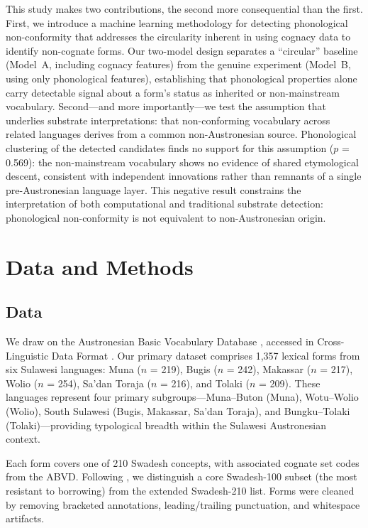 \documentclass[12pt]{article}
\begin{document}
This study makes two contributions, the second more consequential than the first.
First, we introduce a machine learning methodology for detecting phonological non-conformity that addresses the circularity inherent in using cognacy data to identify non-cognate forms.
Our two-model design separates a ``circular'' baseline (Model~A, including cognacy features) from the genuine experiment (Model~B, using only phonological features), establishing that phonological properties alone carry detectable signal about a form's status as inherited or non-mainstream vocabulary.
Second---and more importantly---we test the assumption that underlies substrate interpretations: that non-conforming vocabulary across related languages derives from a common non-Austronesian source.
Phonological clustering of the detected candidates finds no support for this assumption ($p$ = 0.569): the non-mainstream vocabulary shows no evidence of shared etymological descent, consistent with independent innovations rather than remnants of a single pre-Austronesian language layer.
This negative result constrains the interpretation of both computational and traditional substrate detection: phonological non-conformity is not equivalent to non-Austronesian origin.

\section{Data and Methods}

\subsection{Data}
\label{sec:data}

We draw on the Austronesian Basic Vocabulary Database \citep{greenhill2008}, accessed in Cross-Linguistic Data Format \citep[CLDF;][]{forkel2018}.
Our primary dataset comprises 1,357 lexical forms from six Sulawesi languages: Muna ($n$ = 219), Bugis ($n$ = 242), Makassar ($n$ = 217), Wolio ($n$ = 254), Sa'dan Toraja ($n$ = 216), and Tolaki ($n$ = 209).
These languages represent four primary subgroups---Muna--Buton (Muna), Wotu--Wolio (Wolio), South Sulawesi (Bugis, Makassar, Sa'dan Toraja), and Bungku--Tolaki (Tolaki)---providing typological breadth within the Sulawesi Austronesian context.

Each form covers one of 210 Swadesh concepts, with associated cognate set codes from the ABVD.
Following \citet{swadesh1955}, we distinguish a core Swadesh-100 subset (the most resistant to borrowing) from the extended Swadesh-210 list.
Forms were cleaned by removing bracketed annotations, leading/trailing punctuation, and whitespace artifacts.
\end{document}
